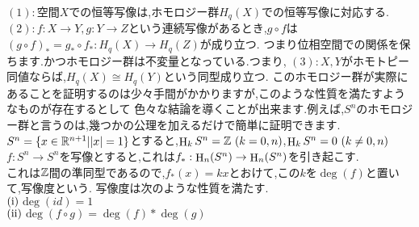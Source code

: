 $(1):$空間$X$での恒等写像は,ホモロジー群$H_q(X)$での恒等写像に対応する.\\
$(2):$$f:X\to Y,g:Y\to Z$という連続写像があるとき,$g\circ f$は$(g\circ f)_* = g_* \circ f_* :H_q(X) \to H_q(Z)$が成り立つ.
つまり位相空間での関係を保ちます.かつホモロジー群は不変量となっている.つまり,
$(3):$$X,Y$がホモトピー同値ならば,$H_q(X) \cong H_q(Y)$という同型成り立つ.
このホモロジー群が実際にあることを証明するのは少々手間がかかりますが,このような性質を満たすようなものが存在するとして
色々な結論を導くことが出来ます.例えば,$S^n$のホモロジー群と言うのは,幾つかの公理を加えるだけで簡単に証明できます.
\thm
$S^n=\{x\in\mathbb R^{n+1} | |x|=1\}$とすると,$\mathop{\mathrm{H}}\nolimits_k S^n = \mathbb Z\  (k=0,n)$,$\mathop{\mathrm{H}}\nolimits_k S^n = 0\  (k\neq 0,n)$
\thmx
\thm
$f:S^n \to S^n$を写像とすると,これは$f_*:\mathop{\mathrm{H}}\nolimits_n(S^n)\to \mathop{\mathrm{H}}\nolimits_n(S^n)$を引き起こす.\\
これは$\mathbb Z$間の準同型であるので,$f_*(x) = kx$とおけて,この$k$を$\deg(f)$と置いて,写像度という.
\thmx
\prop
写像度は次のような性質を満たす.\\
$\rm (i)$$\deg(id)=1$\\
$\rm (ii)$$\deg(f\circ g) = \deg(f)*\deg(g)$\\

